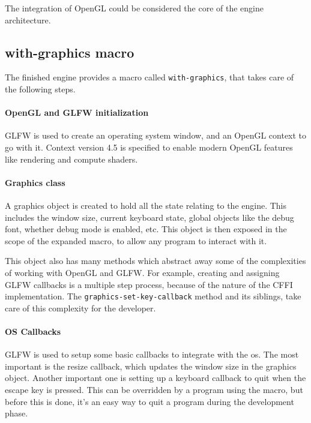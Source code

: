 

The integration of OpenGL could be considered the core of the engine architecture.

\subsection{with-graphics macro}

The finished engine provides a macro called \texttt{with-graphics},
that takes care of the following steps.

\paragraph{OpenGL and GLFW initialization}

GLFW is used to create an operating system window,
and an OpenGL context to go with it.
Context version 4.5 is specified to enable modern OpenGL features like rendering and compute shaders.

\paragraph{Graphics class}

A graphics object is created to hold all the state relating to the engine.
This includes the window size,
current keyboard state,
global objects like the debug font,
whether debug mode is enabled,
etc.
This object is then exposed in the scope of the expanded macro,
to allow any program to interact with it.

This object also has many methods which abstract away some of the complexities of working with OpenGL and GLFW.
For example,
creating and assigning GLFW callbacks is a multiple step process,
because of the nature of the CFFI implementation.
The \texttt{graphics-set-key-callback} method and its siblings,
take care of this complexity for the developer.

\paragraph{OS Callbacks}

GLFW is used to setup some basic callbacks to integrate with the \ac{os}.
The most important is the resize callback,
which updates the window size in the graphics object.
Another important one is setting up a keyboard callback to quit when the escape key is pressed.
This can be overridden by a program using the macro,
but before this is done,
it's an easy way to quit a program during the development phase.

